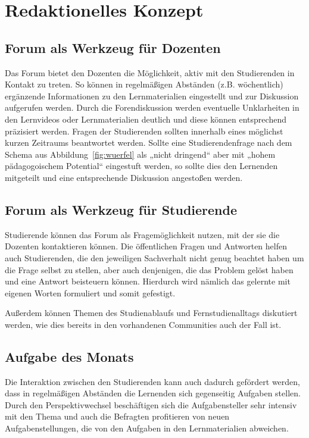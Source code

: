 
\section{Redaktionelles Konzept} %
\label{sec:redaktionelles_konzept}
\subsection{Forum als Werkzeug für Dozenten} %
\label{sub:forum_als_werkzeug_fur_dozenten}
Das Forum bietet den Dozenten die Möglichkeit, aktiv mit den Studierenden in Kontakt zu treten. So können in regelmäßigen Abständen (z.B. wöchentlich) ergänzende Informationen zu den Lernmaterialien eingestellt und zur Diskussion aufgerufen werden. Durch die Forendiskussion werden eventuelle Unklarheiten in den Lernvideos oder Lernmaterialien deutlich und diese können entsprechend präzisiert werden. Fragen der Studierenden sollten innerhalb eines möglichst kurzen Zeitraums beantwortet werden. Sollte eine Studierendenfrage nach dem Schema aus Abbildung~\ref{fig:wuerfel} als „nicht dringend“ aber mit „hohem pädagogoischem Potential“ eingestuft werden, so sollte dies den Lernenden mitgeteilt und eine entsprechende Diskussion angestoßen werden.

\subsection{Forum als Werkzeug für Studierende} %
\label{sub:forum_als_werkzeug_fur_studierende}
Studierende können das Forum als Fragemöglichkeit nutzen, mit der sie die Dozenten kontaktieren können. Die öffentlichen Fragen und Antworten helfen auch Studierenden, die den jeweiligen Sachverhalt nicht genug beachtet haben um die Frage selbst zu stellen, aber auch denjenigen, die das Problem gelöst haben und eine Antwort beisteuern können. Hierdurch wird nämlich das gelernte mit eigenen Worten formuliert und somit gefestigt.

Außerdem können Themen des Studienablaufs und Fernstudienalltags diskutiert werden, wie dies bereits in den vorhandenen Communities auch der Fall ist.

\subsection{Aufgabe des Monats} %
\label{sub:aufgabe_des_monats}
Die Interaktion zwischen den Studierenden kann auch dadurch gefördert werden, dass in regelmäßigen Abständen die Lernenden sich gegenseitig Aufgaben stellen. Durch den Perspektivwechsel beschäftigen sich die Aufgabensteller sehr intensiv mit den Thema und auch die Befragten profitieren von neuen Aufgabenstellungen, die von den Aufgaben in den Lernmaterialien abweichen.

